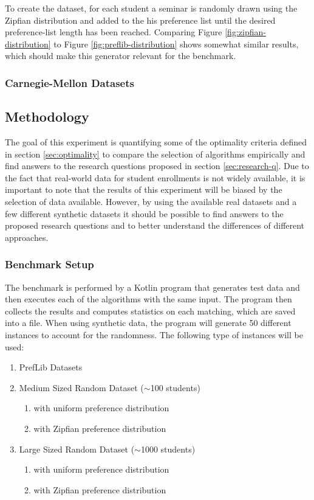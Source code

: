 To create the dataset, for each student a seminar is randomly drawn using the Zipfian distribution and added to the his preference list until the desired preference-list length has been reached. Comparing Figure \ref{fig:zipfian-distribution} to Figure \ref{fig:preflib-distribution} shows somewhat similar results, which should make this generator relevant for the benchmark. 

\subsubsection{Carnegie-Mellon Datasets}

\subsection{Methodology}
The goal of this experiment is quantifying some of the optimality criteria defined in section \ref{sec:optimality} to compare the selection of algorithms empirically and find answers to the research questions proposed in section \ref{sec:research-q}. Due to the fact that real-world data for student enrollments is not widely available, it is important to note that the results of this experiment will be biased by the selection of data available. However, by using the available real datasets and a few different synthetic datasets it should be possible to find answers to the proposed research questions and to better understand the differences of different approaches.

\subsubsection{Benchmark Setup}
The benchmark is performed by a Kotlin program that generates test data and then executes each of the algorithms with the same input. The program then collects the results and computes statistics on each matching, which are saved into a file. When using synthetic data, the program will generate 50 different instances to account for the randomness. The following type of instances will be used:
\begin{enumerate}
  \item PrefLib Datasets
  \item Medium Sized Random Dataset ($\sim$100 students)
  \begin{enumerate}
    \item with uniform preference distribution
    \item with Zipfian preference distribution
  \end{enumerate}
  \item Large Sized Random Dataset ($\sim$1000 students)
  \begin{enumerate}
    \item with uniform preference distribution
    \item with Zipfian preference distribution
  \end{enumerate}
\end{enumerate}

